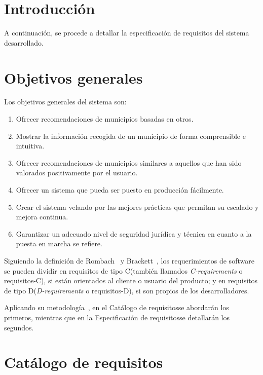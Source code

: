 
\section{Introducción}

A continuación, se procede a detallar la especificación de requisitos del sistema desarrollado.

\section{Objetivos generales}

Los objetivos generales del sistema son:

\begin{enumerate}
    \item Ofrecer recomendaciones de municipios basadas en otros.
    \item Mostrar la información recogida de un municipio de forma comprensible e intuitiva.
    \item Ofrecer recomendaciones de municipios similares a aquellos que han sido valorados positivamente por el usuario.
    \item Ofrecer un sistema que pueda ser puesto en producción fácilmente.
    \item Crear el sistema velando por las mejores prácticas que permitan su escalado y mejora continua.
    \item Garantizar un adecuado nivel de seguridad jurídica y técnica en cuanto a la puesta en marcha se refiere.
\end{enumerate}

Siguiendo la definición de Rombach~\cite{rombach} y Brackett~\cite{brackett}, los requerimientos de software se pueden dividir en requisitos de tipo \guillemotleft C\guillemotright\space (también llamados \textit{C-requirements} o requisitos-C), si están orientados al cliente o usuario del producto; y en requisitos de tipo \guillemotleft D\guillemotright\space (\textit{D-requirements} o requisitos-D), si son propios de los desarrolladores.

Aplicando su metodología~\cite{usal_inso_i}, en el \guillemotleft Catálogo de requisitos\guillemotright\space se abordarán los primeros, mientras que en la \guillemotleft Especificación de requisitos\guillemotright\space se detallarán los segundos.

\section{Catálogo de requisitos}

